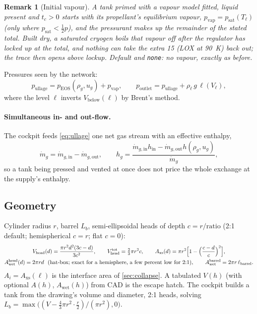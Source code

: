 \documentclass[11pt,a4paper]{article}
\newtheorem{remark}{Remark}
\newcommand{\mdot}{\dot{m}}
\newcommand{\code}[1]{\texttt{#1}}
\begin{document}
\begin{remark}[Initial vapour]
A tank primed with a vapour model fitted, liquid present and $t_c>0$ starts
with its propellant's equilibrium vapour, $p_{\mathrm{vap}}=p_{\mathrm{sat}}(T_\ell)$
(only where $p_{\mathrm{sat}}<\tfrac12 p$), and the pressurant makes up the
\emph{remainder} of the stated total. Built dry, a saturated cryogen boils
that vapour off after the regulator has locked up at the total, and nothing
can take the extra \SI{15}{\psi} (LOX at \SI{90}{\kelvin}) back out; the trace
then opens above lockup. Default and \code{none}: no vapour, exactly as before.
\end{remark} Pressures seen by the network:
\begin{equation}
  p_{\mathrm{ullage}} = p_{\mathrm{EOS}}(\rho_g,u_g) + p_{\mathrm{vap}},\qquad
  p_{\mathrm{outlet}} = p_{\mathrm{ullage}} + \rho_\ell\,g\,\ell(V_\ell),
  \label{eq:outlet}
\end{equation}
where the level $\ell$ inverts $V_{\mathrm{below}}(\ell)$ by Brent's method.

\paragraph{Simultaneous in- and out-flow.} The cockpit feeds \cref{eq:ullage}
one net gas stream with an effective enthalpy,
\begin{equation}
  \mdot_g = \mdot_{g,\mathrm{in}}-\mdot_{g,\mathrm{out}},\qquad
  h_g = \frac{\mdot_{g,\mathrm{in}}h_{\mathrm{in}} - \mdot_{g,\mathrm{out}}h(\rho_g,u_g)}{\mdot_g},
\end{equation}
so a tank being pressed and vented at once does not price the whole exchange
at the supply's enthalpy.

\subsection{Geometry}
Cylinder radius $r$, barrel $L_b$, semi-ellipsoidal heads of depth $c=r/\text{ratio}$
(2:1 default; hemispherical $c=r$; flat $c=0$):
\begin{gather}
  V_{\mathrm{head}}(d) = \frac{\pi r^2 d^2(3c-d)}{3c^2},\qquad
  V_{\mathrm{head}}^{\mathrm{tot}}=\tfrac23\pi r^2c,\qquad
  A_{\mathrm{xs}}(d) = \pi r^2\Bigl[1-\Bigl(\frac{c-d}{c}\Bigr)^2\Bigr],\\
  A_{\mathrm{wet}}^{\mathrm{head}}(d) = 2\pi r d\ \ (\text{hat-box; exact for a hemisphere, a few percent low for 2:1}),\qquad
  A_{\mathrm{wet}}^{\mathrm{barrel}}=2\pi r\,\ell_{\mathrm{barrel}}.
\end{gather}
$A_i = A_{\mathrm{xs}}(\ell)$ is the interface area of \cref{sec:collapse}.
A tabulated $V(h)$ (with optional $A(h)$, $A_{\mathrm{wet}}(h)$) from CAD is the
escape hatch. The cockpit builds a tank from the drawing's volume and diameter,
2:1 heads, solving $L_b = \max\bigl((V-\tfrac43\pi r^2\cdot\tfrac r2)/(\pi r^2),0\bigr)$.
\end{document}
